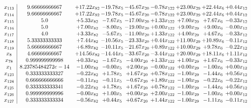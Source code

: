 \documentclass[8pt]{article}
\begin{document}
\[\begin{array}{c| c c@{\hskip 2pt} c@{\hskip 2pt} c@{\hskip 2pt} c@{\hskip 2pt} c@{\hskip 2pt} c@{\hskip 2pt} c@{\hskip 2pt} }
 x_{113}   &  9.66666666667 & + 17.22 x_{82} & -19.78 x_{5} & -45.67 x_{20} & -0.78 x_{122} & + 23.00 x_{29} & + 22.44 x_{6} & +  0.44 x_{12}\\
 x_{114}   &  9.66666666667 & + 17.22 x_{82} & -19.78 x_{5} & -45.67 x_{20} & -0.78 x_{122} & + 23.00 x_{29} & + 22.44 x_{6} & +  0.44 x_{12}\\
 x_{115}   &  5.0 & +  5.33 x_{82} & -7.67 x_{5} & -17.00 x_{20} & +  1.33 x_{122} & +  7.00 x_{29} & +  7.67 x_{6} & -0.33 x_{12}\\
 x_{116}   &  5.0 & +  7.00 x_{82} & -8.00 x_{5} & -19.00 x_{20} & +  0.00 x_{122} & +  9.00 x_{29} & +  9.00 x_{6} & -0.00 x_{12}\\
 x_{117}   &  4.0 & +  3.33 x_{82} & -5.67 x_{5} & -11.00 x_{20} & +  1.33 x_{122} & +  4.00 x_{29} & +  4.67 x_{6} & -0.33 x_{12}\\
 x_{118}   &  5.33333333333 & +  7.44 x_{82} & -10.56 x_{5} & -23.33 x_{20} & +  0.44 x_{122} & + 11.00 x_{29} & + 10.89 x_{6} & -0.11 x_{12}\\
 x_{119}   &  5.66666666667 & +  6.89 x_{82} & -10.11 x_{5} & -21.67 x_{20} & +  0.89 x_{122} & + 10.00 x_{29} & +  9.78 x_{6} & -0.22 x_{12}\\
 x_{8}   &  4.66666666667 & + 14.56 x_{82} & -14.44 x_{5} & -33.67 x_{20} & -3.44 x_{122} & + 20.00 x_{29} & + 18.11 x_{6} & +  1.11 x_{12}\\
 x_{78}   &  0.999999999998 & +  0.33 x_{82} & -1.67 x_{5} & -4.00 x_{20} & +  1.33 x_{122} & +  1.00 x_{29} & +  1.67 x_{6} & -0.33 x_{12}\\
 x_{1}   &  8.23785484272e-14 & -1.00 x_{82} & -0.00 x_{5} & +  2.00 x_{20} & -0.00 x_{122} & +  0.00 x_{29} & -1.00 x_{6} & +  0.00 x_{12}\\
 x_{123}   &  0.333333333327 & -0.22 x_{82} & +  1.78 x_{5} & +  1.67 x_{20} & +  0.78 x_{122} & -1.00 x_{29} & -1.44 x_{6} & +  0.56 x_{12}\\
 x_{124}   &  0.666666666666 & -0.11 x_{82} & -0.11 x_{5} & -0.67 x_{20} & +  1.89 x_{122} & -1.00 x_{29} & -0.22 x_{6} & -0.22 x_{12}\\
 x_{125}   &  0.333333333341 & -0.22 x_{82} & +  1.78 x_{5} & +  1.67 x_{20} & +  0.78 x_{122} & -1.00 x_{29} & -1.44 x_{6} & +  0.56 x_{12}\\
 x_{126}   &  0.999999999996 & -0.00 x_{82} & +  1.00 x_{5} & +  0.00 x_{20} & +  2.00 x_{122} & -1.00 x_{29} & -1.00 x_{6} & +  0.00 x_{12}\\
 x_{127}   &  0.333333333334 & -0.56 x_{82} & +  0.44 x_{5} & +  0.67 x_{20} & +  1.44 x_{122} & -1.00 x_{29} & -1.11 x_{6} & -0.11 x_{12}\\

\end{array}\]
\end{document}
